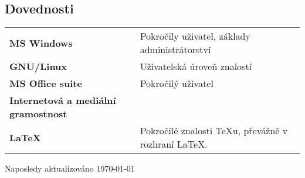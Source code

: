 \documentclass[verylight]{simplehipstercv}
\newlength{\rightcolwidth}
\begin{document}
\begin{paracol}{2}
\begin{minipage}[t]{0.7\textwidth}
\section*{Dovednosti}
\begin{tabular}{>{\footnotesize\bfseries}l >{\footnotesize}p{}}
    MS Windows & Pokročily uživatel, základy administrátorství \\
    GNU/Linux & Uživatelská úroveň znalostí \\
    MS Office suite & Pokročilý uživatel \\
    Internetová a mediální gramostnost \\
    LaTeX & Pokročilé znalosti TeXu, převážně v rozhraní LaTeX.
\end{tabular}
\end{minipage}






\vfill{} %

\setlength{\parindent}{0pt}
\begin{minipage}[t]{\rightcolwidth}
\begin{center}\fontfamily{\sfdefault}\selectfont \color{black!70}
{Naposledy aktualizováno \today
}
\end{center}
\end{minipage}

\end{paracol}
\end{document}
